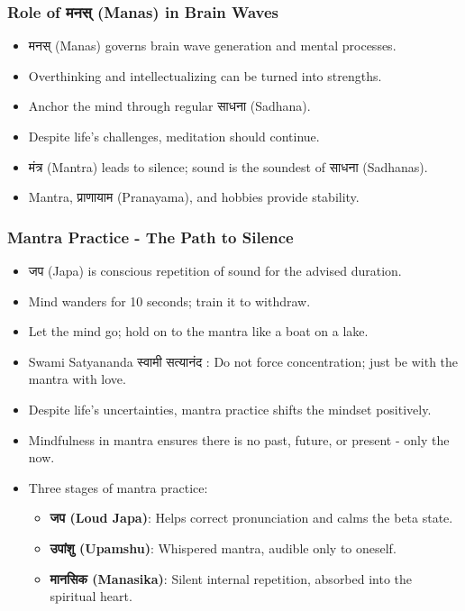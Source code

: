 \begin{frame}[fragile]\frametitle{Role of मनस् (Manas) in Brain Waves}
      \begin{itemize}
          \item मनस् (Manas) governs brain wave generation and mental processes.
          \item Overthinking and intellectualizing can be turned into strengths.
          \item Anchor the mind through regular साधना (Sadhana).
          \item Despite life’s challenges, meditation should continue.
          \item मंत्र (Mantra) leads to silence; sound is the soundest of साधना (Sadhanas).
          \item Mantra, प्राणायाम (Pranayama), and hobbies provide stability.
      \end{itemize}
\end{frame}

\begin{frame}[fragile]\frametitle{Mantra Practice - The Path to Silence}
      \begin{itemize}
          \item जप (Japa) is conscious repetition of sound for the advised duration.
          \item Mind wanders for 10 seconds; train it to withdraw.
          \item Let the mind go; hold on to the mantra like a boat on a lake.
          \item Swami Satyananda स्वामी सत्यानंद : Do not force concentration; just be with the mantra with love.
          \item Despite life’s uncertainties, mantra practice shifts the mindset positively.
          \item Mindfulness in mantra ensures there is no past, future, or present - only the now.
          \item Three stages of mantra practice:
            \begin{itemize}
                \item \textbf{ जप (Loud Japa)}: Helps correct pronunciation and calms the beta state.
                \item \textbf{उपांशु (Upamshu)}: Whispered mantra, audible only to oneself.
                \item \textbf{मानसिक (Manasika)}: Silent internal repetition, absorbed into the spiritual heart.
            \end{itemize}
      \end{itemize}
\end{frame}


